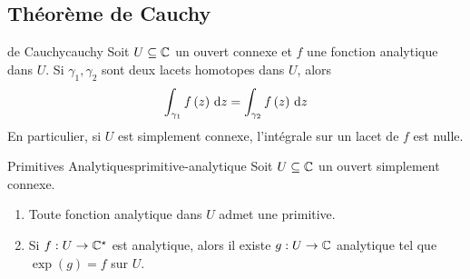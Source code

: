 \documentclass{cours}
\begin{document}
\subsection{Théorème de Cauchy}
\begin{théorème}{de Cauchy}{cauchy}
    Soit $U \subseteq \mathbb{C}$ un ouvert connexe et $f$ une fonction analytique dans $U$. Si $\gamma_{1}, \gamma_{2}$ sont deux lacets homotopes dans $U$, alors
    \begin{equation*}
        \int_{\gamma_{1}}f\left(z\right) {\rm \, d} z = \int_{\gamma_{2}}f\left(z\right){\rm \, d} z
    \end{equation*}
    En particulier, si $U$ est simplement connexe, l'intégrale sur un lacet de $f$ est nulle. 
\end{théorème}

\begin{théorème}{Primitives Analytiques}{primitive-analytique}
    Soit $U \subseteq \mathbb{C}$ un ouvert simplement connexe. 
    \begin{enumerate}
        \item Toute fonction analytique dans $U$ admet une primitive.
        \item Si $f : U \to \mathbb{C}^{\star}$ est analytique, alors il existe $g : U \to \mathbb{C}$ analytique tel que $\exp\left(g\right) = f$ sur $U$. 
    \end{enumerate}
\end{théorème}
\end{document}
